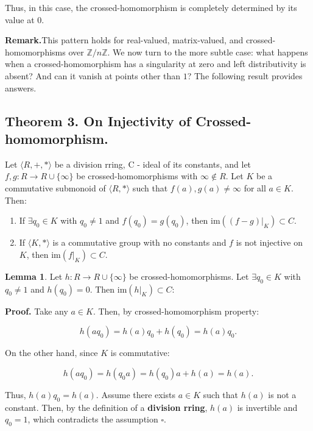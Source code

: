 \documentclass[12pt]{article}
\theoremstyle{definition}
\newtheorem{lemma}[definition]{Lemma}
\begin{document}
\vspace{10pt}
Thus, in this case, the crossed-homomorphism is completely determined by its value at $0$.

\vspace{10pt}
\noindent\textbf{Remark.}This pattern holds for real-valued, matrix-valued, and crossed-homomorphisms over $\mathbb{Z}/n\mathbb{Z}$. We now turn to the more subtle case: what happens when a crossed-homomorphism has a singularity at zero and left distributivity is absent? And can it vanish at points other than $1$? The following result provides answers.

\vspace{10pt}

\subsection{Theorem 3. On Injectivity of Crossed-homomorphism.}   
Let $\langle R, +, * \rangle$ be a division rring, C - ideal of its constants, and let $f, g: R \to R \cup \{\infty\}$ be crossed-homomorphisms with $\infty \notin R$. Let $K$ be a commutative submonoid of $\langle R, * \rangle$ such that $f(a), g(a) \ne \infty$ for all $a \in K$. Then:  

\begin{enumerate}
\item If $\exists q_0 \in K$ with $q_0 \neq 1$ and $f(q_0) = g(q_0)$, then $\mathrm{im}((f - g)|_K) \subset C$.
\item If $\langle K, * \rangle$ is a commutative group with no constants and $f$ is not injective on $K$, then $\mathrm{im}(f|_K) \subset C$.
\end{enumerate}

\newpage
\begin{lemma}  Let $h: R \to R \cup \{\infty\}$ be crossed-homomorphisms. Let $\exists q_0 \in K$ with $q_0 \neq 1$ and $h(q_0)=0.$ Then $\mathrm{im}(h|_K) \subset C$:

\vspace{5pt}
\noindent\textbf{Proof.} Take any $a \in K$. Then, by crossed-homomorphism property:

\[
h(a q_0) = h(a)q_0 + h(q_0) = h(a)q_0.
\]

\noindent On the other hand, since $K$ is commutative:

\[
h(a q_0) = h(q_0 a) = h(q_0)a + h(a) = h(a).
\]

\noindent Thus, $h(a)q_0 = h(a)$. Assume there exists $a \in K$ such that $h(a)$ is not a constant. Then, by the definition of a \textbf{division rring}, $h(a)$ is invertible and $q_0 = 1$, which contradicts the assumption $\square$. 
\end{lemma}
\end{document}
